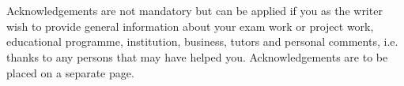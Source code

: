 \section*{}\label{sec:acknowledgements}
{} 
Acknowledgements are not mandatory but can be applied if you as the writer wish to provide general
information about your exam work or project work, educational programme, institution, business,
tutors and personal comments, i.e. thanks to any persons that may have helped you. Acknowledgements
are to be placed on a separate page.
